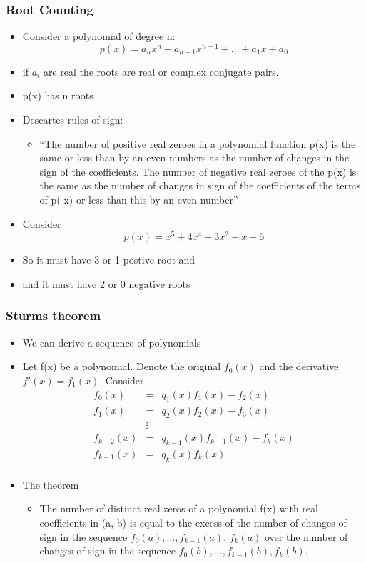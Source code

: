 \documentclass[10pt]{beamer}
\begin{document}
\begin{frame}
  \frametitle{Root Counting}
  \begin{itemize}
  \item Consider a polynomial of degree n:
    \[
      p(x) = a_n x^n + a_{n-1} x^{n-1} + \ldots + a_1 x + a_0
    \]
  \item if $a_i$ are real the roots are real or complex conjugate pairs. 
  \item p(x) has n roots
  \item Descartes rules of sign:
    \begin{itemize}
    \item ``The number of positive real zeroes in a polynomial
      function p(x) is the same or less than by an even numbers as the
      number of changes in the sign of the coefficients. The number of
      negative real zeroes of the p(x) is the same as the number of
      changes in sign of the coefficients of the terms of p(-x) or
      less than this by an even number''
    \end{itemize}
  \item Consider
    \[
      p(x) = x^5 + 4 x^4 - 3 x^2 + x -6
    \]
  \item So it must have 3 or 1 postive root and
  \item and it must have 2 or 0 negative roots
  \end{itemize}
\end{frame}

\begin{frame}
  \frametitle{Sturms theorem}
  \begin{itemize}
  \item We can derive a sequence of polynomials
  \item Let f(x) be a polynomial. Denote the original $f_0(x)$ and the
    derivative $f'(x) = f_1(x)$. Consider
    \[
      \begin{array}{rcl}
        f_0(x)      &=& q_1(x) f_1(x) - f_2(x) \\
        f_1(x)      &=& q_2(x) f_2(x) - f_3(x) \\
                 &\vdots& \\
        f_{k-2}(x) &=& q_{k-1}(x) f_{k-1}(x) - f_k(x) \\
        f_{k-1}(x) &=& q_k(x) f_k(x) \\
      \end{array}
    \]
  \item The theorem
    \begin{itemize}
    \item The number of distinct real zeros of a polynomial f(x)
      with real coefficients in (a, b) is equal to the excess of the
      number of changes of sign in the sequence $f_0(a), \ldots ,
      f_{k−1}(a)$, $f_k(a)$ over the number of changes of sign in the
      sequence $f_0(b), \ldots , f_{k−1}(b), f_k(b)$.
    \end{itemize}
  \end{itemize}
\end{frame}
\end{document}
